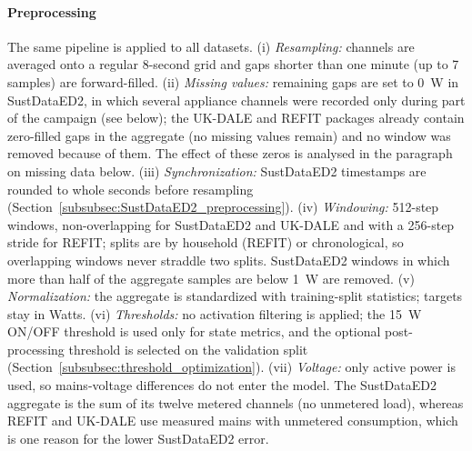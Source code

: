 \documentclass[fleqn,10pt]{wlscirep}
\begin{document}
\paragraph{Preprocessing} The same pipeline is applied to all datasets. (i) \textit{Resampling:} channels are averaged onto a regular 8-second grid and gaps shorter than one minute (up to 7 samples) are forward-filled. (ii) \textit{Missing values:} remaining gaps are set to 0~W in SustDataED2, in which several appliance channels were recorded only during part of the campaign (see below); the UK-DALE and REFIT packages already contain zero-filled gaps in the aggregate (no missing values remain) and no window was removed because of them. The effect of these zeros is analysed in the paragraph on missing data below. (iii) \textit{Synchronization:} SustDataED2 timestamps are rounded to whole seconds before resampling (Section~\ref{subsubsec:SustDataED2_preprocessing}). (iv) \textit{Windowing:} 512-step windows, non-overlapping for SustDataED2 and UK-DALE and with a 256-step stride for REFIT; splits are by household (REFIT) or chronological, so overlapping windows never straddle two splits. SustDataED2 windows in which more than half of the aggregate samples are below 1~W are removed. (v) \textit{Normalization:} the aggregate is standardized with training-split statistics; targets stay in Watts. (vi) \textit{Thresholds:} no activation filtering is applied; the 15~W ON/OFF threshold is used only for state metrics, and the optional post-processing threshold is selected on the validation split (Section~\ref{subsubsec:threshold_optimization}). (vii) \textit{Voltage:} only active power is used, so mains-voltage differences do not enter the model. The SustDataED2 aggregate is the sum of its twelve metered channels (no unmetered load), whereas REFIT and UK-DALE use measured mains with unmetered consumption, which is one reason for the lower SustDataED2 error.
\end{document}
